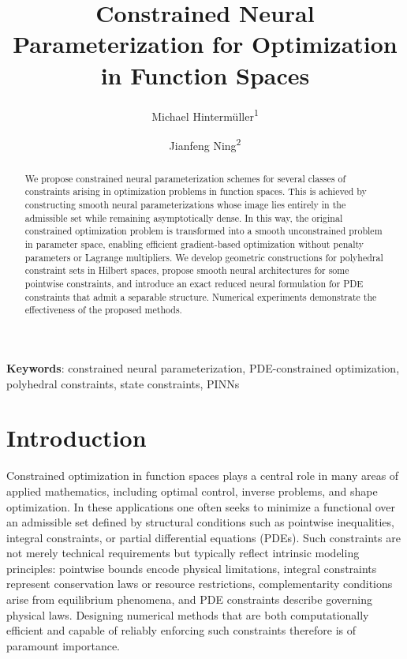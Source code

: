 \documentclass{article}
\title{Constrained Neural Parameterization for Optimization\\ in Function Spaces}
\author[$\dagger \ddagger$]{Michael Hinterm\"uller\textsuperscript{1}}
\author[$\dagger$]{Jianfeng Ning\textsuperscript{2}}
\affil[$\dagger$]{\small Weierstrass Institute for Applied Analysis and Stochastics, Berlin, Germany}
\affil[$\ddagger$]{\small Institute for Mathematics, Humboldt-Universit\"at zu Berlin, Berlin, Germany}
\date{}
\numberwithin{equation}{section}
\newcommand\keywords[1]{\textbf{Keywords}: #1}
\begin{document}
\maketitle
{}
\setcounter{footnote}{2}

\begin{abstract}
We propose constrained neural parameterization schemes for several classes of constraints arising in optimization problems in function spaces.
This is achieved by constructing smooth neural parameterizations whose image lies entirely in the admissible set while remaining asymptotically dense. In this way, the original constrained optimization problem is transformed into a smooth unconstrained problem in parameter space, enabling efficient gradient-based optimization without penalty parameters or Lagrange multipliers. We develop geometric constructions for polyhedral constraint sets in Hilbert spaces, propose smooth neural architectures for some pointwise constraints, and introduce an exact reduced neural formulation for PDE constraints that admit a separable structure. 
Numerical experiments demonstrate the effectiveness of the proposed methods.
\end{abstract}
\keywords{constrained neural parameterization, PDE-constrained optimization, polyhedral constraints, state constraints, PINNs}

\section{Introduction}

Constrained optimization in function spaces plays a central role in many areas of applied mathematics, including optimal control, inverse problems, and shape optimization. In these applications one often seeks to minimize a functional over an admissible set defined by structural conditions such as pointwise inequalities, integral constraints, or partial differential equations (PDEs). Such constraints are not merely technical requirements but typically reflect intrinsic modeling principles: pointwise bounds encode physical limitations, integral constraints represent conservation laws or resource restrictions, complementarity conditions arise from equilibrium phenomena, and PDE constraints describe governing physical laws. Designing numerical methods that are both computationally efficient and capable of reliably enforcing such constraints therefore is of paramount importance.
\end{document}
